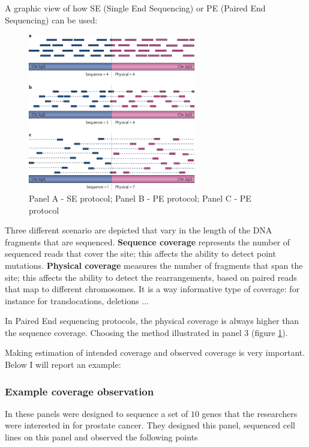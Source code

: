 A graphic view of how SE (Single End Sequencing) or PE (Paired End Sequencing) can be used:

\begin{figure}[H]
  \includegraphics[width=0.65\textwidth]{image15.png}
  \centering
  \caption{Panel A - SE protocol; Panel B - PE protocol; Panel C - PE protocol}
  \label{fig: physical coverage vs coverage}
\end{figure}

Three different scenario are depicted that vary in the length of the DNA
fragments that are sequenced. \textbf{Sequence coverage} represents the number
of sequenced reads that cover the site; this affects the ability to detect point
mutations. \textbf{Physical coverage} measures the number of fragments that span
the site; this affects the ability to detect the rearrangements, based on paired
reads that map to different chromosomes. It is a way informative type of
coverage: for instance for translocations, deletions $\dots$

In Paired End sequencing protocols, the physical coverage is always higher than
the sequence coverage. Choosing the method illustrated in panel 3 (figure
\ref{fig: physical coverage vs coverage}).

Making estimation of intended coverage and observed coverage is very important. Below I will report an example:


\subsubsection{Example coverage observation}

In these panels were designed to sequence a set of $10$ genes that the researchers
were interested in for prostate cancer. They designed this panel, sequenced cell
lines on this panel and observed the following points

